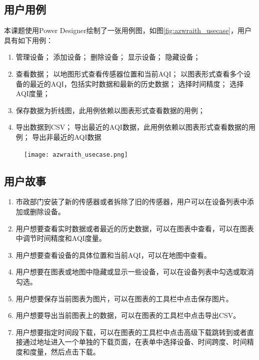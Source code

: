 \subsection{用户用例}
本课题使用Power Designer绘制了一张用例图，如图\ref{fig:azwraith_usecase}，用户具有如下用例：
\begin{enumerate}
  \item 管理设备；
  \subitem 添加设备；
  \subitem 删除设备；
  \subitem 显示设备；
  \subitem 隐藏设备；
  \item 查看数据；
  \subitem 以地图形式查看传感器位置和当前AQI；
  \subitem 以图表形式查看多个设备的最近的AQI，包括实时数据和最新的历史数据；
  \subsubitem 选择时间精度；
  \subsubitem 选择AQI度量；
  \item 保存数据为折线图，此用例依赖以图表形式查看数据的用例；
  \item 导出数据到CSV；
  \subitem 导出最近的AQI数据，此用例依赖以图表形式查看数据的用例；
  \subitem 导出非最近的AQI数据
\end{enumerate}
\begin{figure}[!htp]
 \centering
 \texttt{[image: azwraith\_usecase.png]}
\end{figure}

\subsection{用户故事}
\begin{enumerate}
  \item 市政部门安装了新的传感器或者拆除了旧的传感器，用户可以在设备列表中添加或删除设备。
  \item 用户想要查看实时数据或者最近的历史数据，可以在图表中查看，可以在图表中调节时间精度和AQI度量。
  \item 用户想要查看设备的具体位置和当前AQI，可以在地图中查看。
  \item 用户想要在图表或地图中隐藏或显示一些设备，可以在设备列表中勾选或取消勾选。
  \item 用户想要保存当前图表为图片，可以在图表的工具栏中点击保存图片。
  \item 用户想要导出当前图表上的数据，可以在图表的工具栏中点击导出CSV。
  \item 用户想要指定时间段下载，可以在图表的工具栏中点击高级下载跳转到或者直接通过地址进入一个单独的下载页面，在表单中选择设备、时间跨度、时间精度和度量，然后点击下载。
\end{enumerate}

